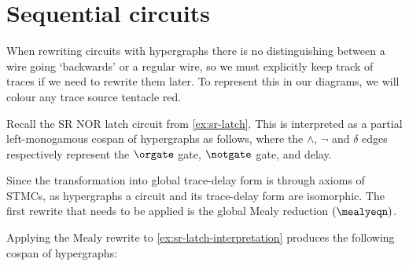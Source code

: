 \section{Sequential circuits}

When rewriting circuits with hypergraphs there is no distinguishing between a
wire going `backwards' or a regular wire, so we must explicitly keep track of
traces if we need to rewrite them later.
To represent this in our diagrams, we will colour any trace source tentacle red.

\begin{example}\label{ex:sr-latch-interpretation}
    Recall the SR NOR latch circuit from \cref{ex:sr-latch}.
    This is interpreted as a partial left-monogamous cospan of hypergraphs as
    follows, where the \(\wedge\), \(\neg\) and \(\delta\) edges respectively
    represent the \(\orgate\) gate, \(\notgate\) gate, and delay.
    \begin{center}
    \end{center}
\end{example}

Since the transformation into global trace-delay form is through axioms
of STMCs, as hypergraphs a circuit and its trace-delay form are isomorphic.
The first rewrite that needs to be applied is the global Mealy reduction
\((\mealyeqn)\).

\begin{example}\label{ex:sr-latch-mealy-graph}
    Applying the Mealy rewrite to \cref{ex:sr-latch-interpretation} produces
    the following cospan of hypergraphs:
    \vspace{-1em}
    \begin{center}
    \end{center}
\end{example}

